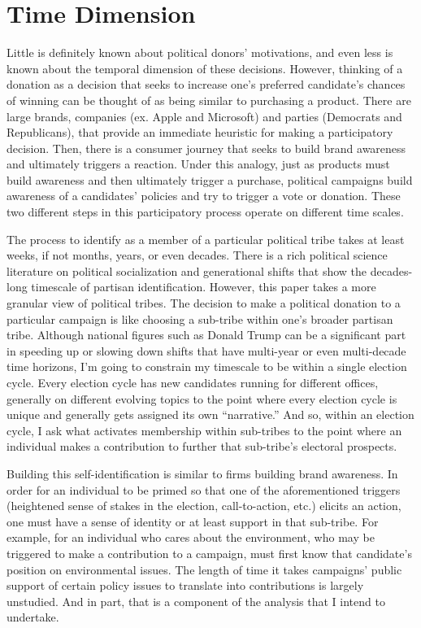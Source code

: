 \documentclass[12pt,]{article}
\begin{document}
\hypertarget{time-dimension}{%
\section{Time Dimension}\label{time-dimension}}

Little is definitely known about political donors' motivations, and even
less is known about the temporal dimension of these decisions. However,
thinking of a donation as a decision that seeks to increase one's
preferred candidate's chances of winning can be thought of as being
similar to purchasing a product. There are large brands, companies (ex.
Apple and Microsoft) and parties (Democrats and Republicans), that
provide an immediate heuristic for making a participatory decision.
Then, there is a consumer journey that seeks to build brand awareness
and ultimately triggers a reaction. Under this analogy, just as products
must build awareness and then ultimately trigger a purchase, political
campaigns build awareness of a candidates' policies and try to trigger a
vote or donation. These two different steps in this participatory
process operate on different time scales.

The process to identify as a member of a particular political tribe
takes at least weeks, if not months, years, or even decades. There is a
rich political science literature on political socialization and
generational shifts that show the decades-long timescale of partisan
identification. However, this paper takes a more granular view of
political tribes. The decision to make a political donation to a
particular campaign is like choosing a sub-tribe within one's broader
partisan tribe. Although national figures such as Donald Trump can be a
significant part in speeding up or slowing down shifts that have
multi-year or even multi-decade time horizons, I'm going to constrain my
timescale to be within a single election cycle. Every election cycle has
new candidates running for different offices, generally on different
evolving topics to the point where every election cycle is unique and
generally gets assigned its own ``narrative.'' And so, within an
election cycle, I ask what activates membership within sub-tribes to the
point where an individual makes a contribution to further that
sub-tribe's electoral prospects.

Building this self-identification is similar to firms building brand
awareness. In order for an individual to be primed so that one of the
aforementioned triggers (heightened sense of stakes in the election,
call-to-action, etc.) elicits an action, one must have a sense of
identity or at least support in that sub-tribe. For example, for an
individual who cares about the environment, who may be triggered to make
a contribution to a campaign, must first know that candidate's position
on environmental issues. The length of time it takes campaigns' public
support of certain policy issues to translate into contributions is
largely unstudied. And in part, that is a component of the analysis that
I intend to undertake.
\end{document}
